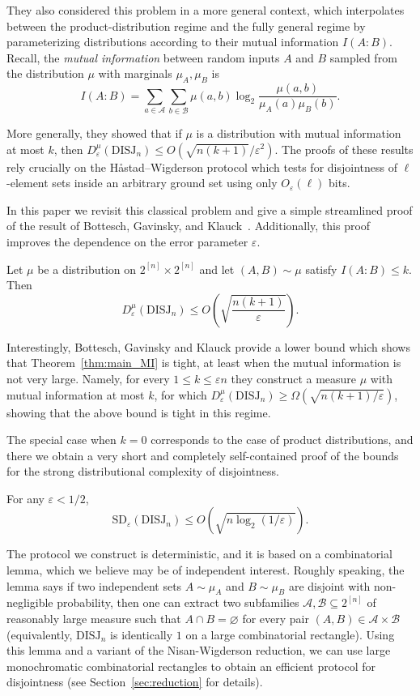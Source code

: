 \documentclass[11pt]{amsart}
\theoremstyle{definition}
\def\eps{\varepsilon}
\def\cA{\mathcal{A}}
\def\cB{\mathcal{B}}
\newcommand{\DISJ}{\mathrm{DISJ}}
\newcommand{\SD}{\mathrm{SD}}
\begin{document}
They also considered this problem in a more general context, which interpolates between the product-distribution regime and the fully general regime by parameterizing distributions according to their mutual information $I(A:B)$. Recall, the \textit{mutual information} between random inputs $A$ and $B$ sampled from the distribution $\mu$ with marginals $\mu_A, \mu_B$ is 
\[I(A:B)=\sum_{a\in \cA}\sum_{b\in \cB}\mu(a, b)\log_2\frac{\mu(a, b)}{\mu_A(a)\mu_B(b)}.\]

More generally, they showed that if $\mu$ is a distribution with mutual information at most $k$, then $D_{\eps}^\mu(\DISJ_n)\leq O(\sqrt{n(k+1)}/\eps^2)$. The proofs of these results rely crucially on the H\aa stad--Wigderson protocol \cite{HW} which tests for disjointness of $\ell$-element sets inside an arbitrary ground set using only $O_\eps(\ell)$ bits.

In this paper we revisit this classical problem and give a simple streamlined proof of the result of Bottesch, Gavinsky, and Klauck~\cite{BGK15}. Additionally, this proof  improves the dependence on the error parameter $\eps$.

\begin{theorem}\label{thm:main_MI}
Let $\mu$ be a distribution on $2^{[n]}\times 2^{[n]}$ and let $(A,B)\sim\mu$ satisfy $I(A:B)\leq k$.
Then \[ D^\mu_\eps(\DISJ_n)\leq O\left(\sqrt{\frac{n(k+1)}{\eps}}\right). \]
\end{theorem}

Interestingly, Bottesch, Gavinsky and Klauck provide a lower bound which shows that Theorem~\ref{thm:main_MI} is tight, at least when the mutual information is not very large. Namely, for every $1\leq k\leq \eps n$ they construct a measure $\mu$ with mutual information at most $k$, for which $D^\mu_\eps(\DISJ_n)\geq \Omega(\sqrt{n(k+1)/\eps})$, showing that the above bound is tight in this regime.


The special case when $k=0$ corresponds to the case of product distributions, and there we obtain a very short and completely self-contained proof of the bounds for the strong distributional complexity of disjointness.

\begin{theorem}\label{thm:main_product}
For any $\eps<1/2$,
\[\SD_\eps(\DISJ_n)\leq O\left(\sqrt{n\log_2(1/\eps)}\right).\]
\end{theorem}

The protocol we construct is deterministic, and it is based on a combinatorial lemma, which we believe may be of independent interest. Roughly speaking, the lemma says if two independent sets $A\sim\mu_A$ and $B\sim\mu_B$ are disjoint with non-negligible probability, then one can extract two subfamilies $\mathcal{A},\mathcal{B}\subseteq 2^{[n]}$ of reasonably large measure such that $A\cap B=\varnothing$ for every pair $(A,B)\in\mathcal{A}\times\mathcal{B}$ (equivalently, $\DISJ_n$ is identically $1$ on a large combinatorial rectangle). Using this lemma and a variant of the Nisan-Wigderson reduction, we can use large monochromatic combinatorial rectangles to obtain an efficient protocol for disjointness (see Section~\ref{sec:reduction} for details).
\end{document}
